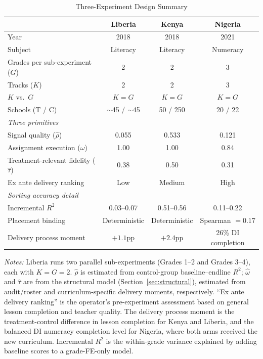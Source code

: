 \documentclass[11pt]{article}
\begin{document}
\begin{table}[H]
\centering
\caption{Three-Experiment Design Summary}
\label{tab:design_summary}
\begin{threeparttable}
\begin{tabular}[t]{lccc}
\toprule
 & Liberia & Kenya & Nigeria \\
\midrule
Year & 2018 & 2018 & 2021 \\
Subject & Literacy & Literacy & Numeracy \\
Grades per sub-experiment ($G$) & 2 & 2 & 3 \\
Tracks ($K$) & 2 & 2 & 3 \\
$K$ vs.\ $G$ & $K = G$ & $K = G$ & $K = G$ \\
Schools (T / C) & $\sim$45 / $\sim$45 & 50 / 250 & 20 / 22 \\
\midrule
\multicolumn{4}{l}{\textit{Three primitives}} \\
Signal quality ($\hat{\rho}$) & 0.055 & 0.533 & 0.121 \\
Assignment execution ($\hat{\omega}$) & 1.00 & 1.00 & 0.84 \\
Treatment-relevant fidelity ($\hat{\tau}$) & 0.38 & 0.50 & 0.31 \\
Ex ante delivery ranking & Low & Medium & High \\
\midrule
\multicolumn{4}{l}{\textit{Sorting accuracy detail}} \\
Incremental $R^2$ & 0.03--0.07 & 0.51--0.56 & 0.11--0.22 \\
Placement binding & Deterministic & Deterministic & Spearman $= 0.17$ \\
	Delivery process moment & $+1.1$pp & $+2.4$pp & 26\% DI completion \\
\bottomrule
\end{tabular}
\begin{tablenotes}
\footnotesize
\item \textit{Notes:} Liberia runs two parallel sub-experiments (Grades 1--2 and Grades 3--4), each with $K = G = 2$. $\hat{\rho}$ is estimated from control-group baseline--endline $R^2$; $\hat{\omega}$ and $\hat{\tau}$ are from the structural model (Section~\ref{sec:structural}), estimated from audit/roster and curriculum-specific delivery moments, respectively. ``Ex ante delivery ranking'' is the operator's pre-experiment assessment based on general lesson completion and teacher quality. The delivery process moment is the treatment-control difference in lesson completion for Kenya and Liberia, and the balanced DI numeracy completion level for Nigeria, where both arms received the new curriculum. Incremental $R^2$ is the within-grade variance explained by adding baseline scores to a grade-FE-only model.
\end{tablenotes}
\end{threeparttable}
\end{table}
\end{document}
